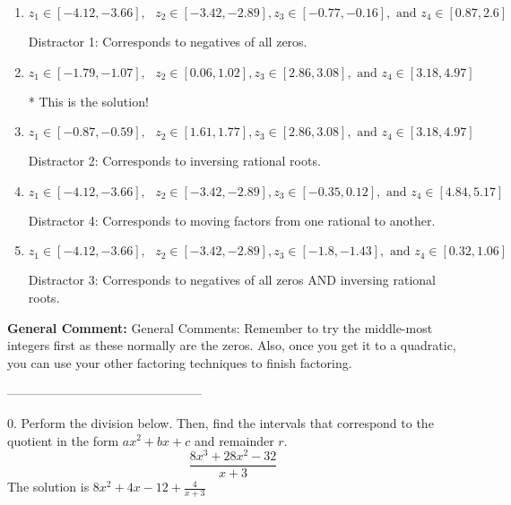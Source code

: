 \documentclass{extbook}[14pt]
\begin{document}
\begin{enumerate}[label=\Alph*.] 
\item $ z_1 \in [-4.12, -3.66], \text{   }  z_2 \in [-3.42, -2.89], z_3 \in [-0.77, -0.16], \text{   and   } z_4 \in [0.87, 2.6] $ 

  Distractor 1: Corresponds to negatives of all zeros. 
\item $ z_1 \in [-1.79, -1.07], \text{   }  z_2 \in [0.06, 1.02], z_3 \in [2.86, 3.08], \text{   and   } z_4 \in [3.18, 4.97] $ 

 * This is the solution! 
\item $ z_1 \in [-0.87, -0.59], \text{   }  z_2 \in [1.61, 1.77], z_3 \in [2.86, 3.08], \text{   and   } z_4 \in [3.18, 4.97] $ 

  Distractor 2: Corresponds to inversing rational roots. 
\item $ z_1 \in [-4.12, -3.66], \text{   }  z_2 \in [-3.42, -2.89], z_3 \in [-0.35, 0.12], \text{   and   } z_4 \in [4.84, 5.17] $ 

  Distractor 4: Corresponds to moving factors from one rational to another. 
\item $ z_1 \in [-4.12, -3.66], \text{   }  z_2 \in [-3.42, -2.89], z_3 \in [-1.8, -1.43], \text{   and   } z_4 \in [0.32, 1.06] $ 

  Distractor 3: Corresponds to negatives of all zeros AND inversing rational roots. 
\end{enumerate} 
 
\textbf{General Comment:} General Comments: Remember to try the middle-most integers first as these normally are the zeros. Also, once you get it to a quadratic, you can use your other factoring techniques to finish factoring. 

-----------------------------------------------

0. Perform the division below. Then, find the intervals that correspond to the quotient in the form $ax^2+bx+c$ and remainder $r$.
\[ \frac{8x^{3} +28 x^{2} -32}{x + 3} \] 
The solution is $ 8x^{2} +4 x -12 + \frac{4}{x + 3} $ 
\end{document}

